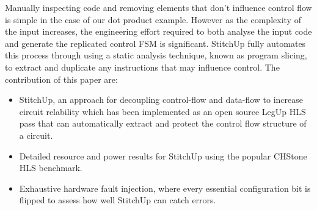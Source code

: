 Manually inspecting code and removing elements that don't influence control flow
is simple in the case of our dot product example.
However as the complexity of the input increases,
the engineering effort required to both analyse the input code and generate
the replicated control FSM is significant.
StitchUp fully automates this process through using a static analysis technique, known as program slicing, to extract
and duplicate any instructions that may influence control. The contribution of this paper are:

\vspace{-10pt}
\begin{itemize}
	\setlength{\itemsep}{1pt}
	\setlength{\parskip}{0pt}
	\setlength{\parsep}{0pt}
	\item StitchUp, an approach for decoupling control-flow and data-flow to increase circuit relability which has been implemented as
          an open source LegUp HLS pass that can automatically extract and protect the control flow structure of a circuit.
	\item Detailed resource and power results for StitchUp using the popular CHStone HLS benchmark.
    \item Exhaustive hardware fault injection, where every essential configuration bit is flipped to assess how well StitchUp can catch errors.
\end{itemize}
%
%
